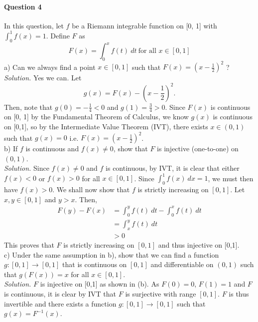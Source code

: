 \documentclass{article}
\begin{document}
\pagebreak

\paragraph{Question 4} In this question, let $f$ be a Riemann integrable function on [0, 1] with $\int_0^1 f(x) = 1$. Define $F$ as 
$$ F(x) = \int_0^x f(t) \ dt \ \text{for all } x \in [0, 1]$$
a) Can we always find a point $x \in [0, 1]$ such that $F(x) = \left(x - \frac{1}{2}\right)^2$ ? \\
\textit{Solution.} Yes we can. Let 
$$ g(x) = F(x) - \left(x - \frac{1}{2}\right)^2. $$
Then, note that $g(0) = -\frac{1}{4}<0$ and $g(1) = \frac{3}{4}>0$. Since $F(x)$ is continuous on [0, 1] by the Fundamental Theorem of Calculus, we know $g(x)$ is continuous on [0,1], so by the Intermediate Value Theorem (IVT), there exists $x \in (0, 1)$ such that $g(x) = 0$ i.e. $F(x) = \left(x - \frac{1}{2}\right)^2$. \\
\linebreak
b) If $f$ is continuous and $f(x) \neq 0$, show that $F$ is injective (one-to-one) on $(0, 1)$. \\
\textit{Solution.} Since $f(x) \neq 0$ and $f$ is continuous, by IVT, it is clear that either $f(x) < 0$ or $f(x) > 0$ for all $x \in [0, 1]$. Since $\int_0^1 f(x) \ dx = 1$, we must then have $f(x) > 0$. We shall now show that $f$ is strictly increasing on $[0, 1]$. Let $x, y \in [0, 1]$ and $y > x$. Then, 
\begin{align*}
    F(y) - F(x) &= \int_0^y f(t) \ dt - \int_0^x f(t) \ dt \\
                &= \int_{x}^y f(t) \ dt \\
                &> 0
\end{align*}        
This proves that $F$ is strictly increasing on $[0, 1]$ and thus injective on [0,1]. \\
\linebreak
c) Under the same assumption in b), show that we can find a function $g:[0, 1] \to [0, 1]$ that is continuous on $[0, 1]$ and differentiable on $(0, 1)$ such that $g(F(x)) = x$ for all $x \in [0, 1]$. \\
\textit{Solution.} $F$ is injective on [0,1] as shown in (b). As $F(0) = 0$, $F(1) = 1$ and $F$ is continuous, it is clear by IVT that $F$ is surjective with range $[0, 1]$. $F$ is thus invertible and there exists a function $g: [0, 1] \to [0, 1]$ such that $g(x) = F^{-1}(x)$. \\
\linebreak
\end{document}
